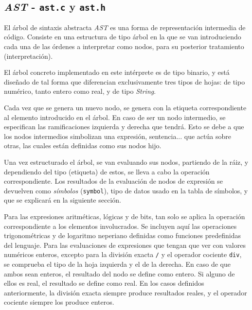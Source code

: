 \documentclass[12pt]{article}
\begin{document}
\subsection{\textit{AST} - \texttt{ast.c} y \texttt{ast.h}}
El árbol de sintaxis abstracta \textit{AST} es una forma de representación intermedia de código. Consiste en una estructura de tipo árbol en la que se van introduciendo cada una de las órdenes a interpretar como nodos, para su posterior tratamiento (interpretación).\par
El árbol concreto implementado en este intérprete es de tipo binario, y está diseñado de tal forma que diferencian exclusivamente tres tipos de hojas: de tipo numérico, tanto entero como real, y de tipo \textit{String}.
\par
Cada vez que se genera un nuevo nodo, se genera con la etiqueta correspondiente al elemento introducido en el árbol. En caso de ser un nodo intermedio, se especifican las ramificaciones izquierda y derecha que tendrá. Esto se debe a que los nodos intermedios simbolizan una expresión, sentencia... que actúa sobre otras, las cuales están definidas como sus nodos hijo.
\par
Una vez estructurado el árbol, se van evaluando sus nodos, partiendo de la ráiz, y dependiendo del tipo (etiqueta) de estos, se lleva a cabo la operación correspondiente. Los resultados de la evaluación de nodos de expresión se devuelven como \textit{símbolos} (\texttt{symbol}), tipo de datos usado en la tabla de símbolos, y que se explicará en la siguiente sección.
\par
Para las expresiones aritméticas, lógicas y de bits, tan solo se aplica la operación correspondiente a los elementos involucrados. Se incluyen aquí las operaciones trigonométricas y de logaritmo neperiano definidas como funciones predefinidas del lenguaje. Para las evaluaciones de expresiones que tengan que ver con valores numéricos enteros, excepto para la división exacta \texttt{/} y el operador cociente \texttt{div}, se comprueba el tipo de la hoja izquierda y el de la derecha. En caso de que ambos sean enteros, el resultado del nodo se define como entero. Si alguno de ellos es real, el resultado se define como real. En los casos definidos anteriormente, la división exacta siempre produce resultados reales, y el operador cociente siempre los produce enteros.
\end{document}
